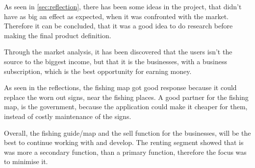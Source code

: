 As seen in \autoref{sec:reflection}, there has been some ideas in the project, that didn't have as big an effect as expected, when it was confronted with the market. Therefore it can be concluded, that it was a good idea to do research before making the final product definition.   


Through the market analysis, it has been discovered that the users isn’t the source to the biggest income, but that it is the businesses, with a business subscription, which is the best opportunity for earning money. 


As seen in the reflections, the fishing map got good response because it could replace the worn out signs, near the fishing places. A good partner for the fishing map, is the government, because the application could make it cheaper for them, instead of costly maintenance of the signs. 


Overall, the fishing guide/map and the sell function for the businesses, will be the best to continue working with and develop. The renting segment showed that is was more a secondary function, than a primary function, therefore the focus was to minimise it. 
